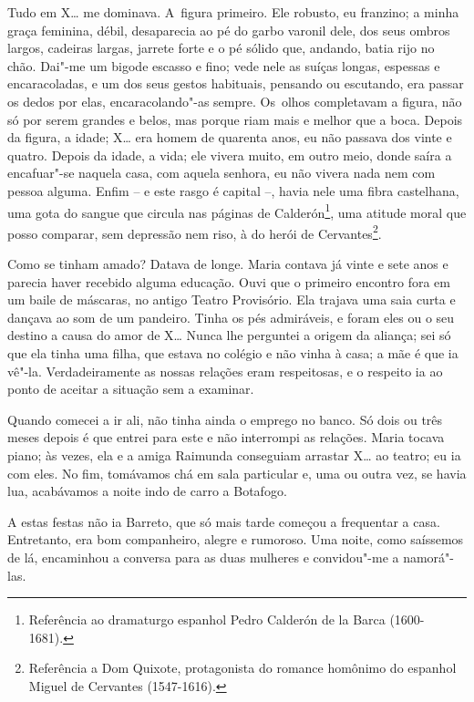Tudo em X\ldots{} me dominava. A~figura primeiro. Ele robusto, eu franzino; a
minha graça feminina, débil, desaparecia ao pé do garbo varonil dele,
dos seus ombros largos, cadeiras largas, jarrete forte e o pé sólido
que, andando, batia rijo no chão. Dai"-me um bigode escasso e fino; vede
nele as suíças longas, espessas e encaracoladas, e um dos seus gestos
habituais, pensando ou escutando, era passar os dedos por elas,
encaracolando"-as sempre. Os~olhos completavam a figura, não só por serem
grandes e belos, mas porque riam mais e melhor que a boca. Depois da
figura, a idade; X\ldots{} era homem de quarenta anos, eu não passava dos
vinte e quatro. Depois da idade, a vida; ele vivera muito, em outro
meio, donde saíra a encafuar"-se naquela casa, com aquela senhora, eu não
vivera nada nem com pessoa alguma. Enfim -- e este rasgo é capital --,
havia nele uma fibra castelhana, uma gota do sangue que circula nas
páginas de Calderón\footnote{Referência ao dramaturgo espanhol Pedro
  Calderón de la Barca (1600-1681).}, uma atitude moral que posso
comparar, sem depressão nem riso, à do herói de Cervantes\footnote{Referência
  a Dom Quixote, protagonista do romance homônimo do espanhol Miguel de
  Cervantes (1547-1616).}.

Como se tinham amado? Datava de longe. Maria contava já vinte e sete
anos e parecia haver recebido alguma educação. Ouvi que o primeiro
encontro fora em um baile de máscaras, no antigo Teatro Provisório. Ela
trajava uma saia curta e dançava ao som de um pandeiro. Tinha os pés
admiráveis, e foram eles ou o seu destino a causa do amor de X\ldots{} Nunca
lhe perguntei a origem da aliança; sei só que ela tinha uma filha, que
estava no colégio e não vinha à casa; a mãe é que ia vê"-la.
Verdadeiramente as nossas relações eram respeitosas, e o respeito ia ao
ponto de aceitar a situação sem a examinar.

Quando comecei a ir ali, não tinha ainda o emprego no banco. Só dois ou
três meses depois é que entrei para este e não interrompi as relações.
Maria tocava piano; às vezes, ela e a amiga Raimunda conseguiam arrastar
X\ldots{} ao teatro; eu ia com eles. No fim, tomávamos chá em sala particular
e, uma ou outra vez, se havia lua, acabávamos a noite indo de carro a
Botafogo.

A estas festas não ia Barreto, que só mais tarde começou a frequentar a
casa. Entretanto, era bom companheiro, alegre e rumoroso. Uma noite,
como saíssemos de lá, encaminhou a conversa para as duas mulheres e
convidou"-me a namorá"-las.

